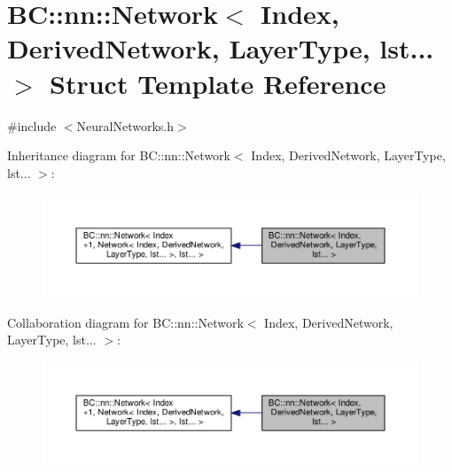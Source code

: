 \hypertarget{structBC_1_1nn_1_1Network_3_01Index_00_01DerivedNetwork_00_01LayerType_00_01lst_8_8_8_01_4}{}\section{BC\+:\+:nn\+:\+:Network$<$ Index, Derived\+Network, Layer\+Type, lst... $>$ Struct Template Reference}
\label{structBC_1_1nn_1_1Network_3_01Index_00_01DerivedNetwork_00_01LayerType_00_01lst_8_8_8_01_4}


{\ttfamily \#include $<$Neural\+Networks.\+h$>$}



Inheritance diagram for BC\+:\+:nn\+:\+:Network$<$ Index, Derived\+Network, Layer\+Type, lst... $>$\+:
\nopagebreak
\begin{figure}[H]
\begin{center}
\leavevmode
\includegraphics[width=350pt]{structBC_1_1nn_1_1Network_3_01Index_00_01DerivedNetwork_00_01LayerType_00_01lst_8_8_8_01_4__inherit__graph}
\end{center}
\end{figure}


Collaboration diagram for BC\+:\+:nn\+:\+:Network$<$ Index, Derived\+Network, Layer\+Type, lst... $>$\+:
\nopagebreak
\begin{figure}[H]
\begin{center}
\leavevmode
\includegraphics[width=350pt]{structBC_1_1nn_1_1Network_3_01Index_00_01DerivedNetwork_00_01LayerType_00_01lst_8_8_8_01_4__coll__graph}
\end{center}
\end{figure}
